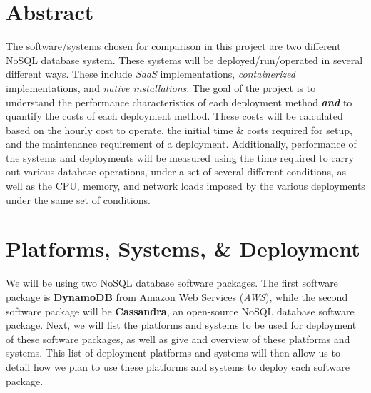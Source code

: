 \documentclass{article}[10pt]
\numberwithin{equation}{section}
\begin{document}
\begin{multicols}{2}
\begin{flushleft}


\section*{Abstract}
\begin{spacing}{1.4}
The software/systems chosen for comparison in this project are two different NoSQL database system.  These systems will be deployed/run/operated in several different ways.  These include \emph{SaaS} implementations, \emph{containerized} implementations, and \emph{native installations}.  The goal of the project is to understand the performance characteristics of each deployment method \emph{\textbf{and}} to quantify the costs of each deployment method.  These costs will be calculated based on the hourly cost to operate, the initial time \& costs required for setup, and the maintenance requirement of a deployment.  Additionally, performance of the systems and deployments will be measured using the time required to carry out various database operations, under a set of several different conditions, as well as the CPU, memory, and network loads imposed by the various deployments under the same set of conditions.
\end{spacing}




\section{Platforms, Systems, \& Deployment}
\begin{spacing}{1.4}
We will be using two NoSQL database software packages.  The first software package is \textbf{DynamoDB} from Amazon Web Services (\emph{AWS}), while the second software package will be \textbf{Cassandra}, an open-source NoSQL database software package.  Next, we will list the platforms and systems to be used for deployment of these software packages, as well as give and overview of these platforms and systems.  This list of deployment platforms and systems will then allow us to detail how we plan to use these platforms and systems to deploy each software package.
\end{spacing}




\end{flushleft}
\end{multicols}
\end{document}
